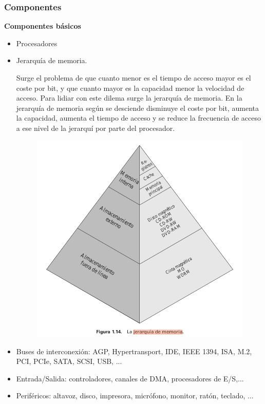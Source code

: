 \documentclass{article}
\begin{document}
\subsubsection{Componentes}
\textbf{Componentes básicos}
\begin{itemize}
\item Procesadores
\item Jerarquía de memoria.

Surge el problema de que cuanto menor es el tiempo de acceso mayor es el coste por bit, y que cuanto mayor es la capacidad menor la velocidad de acceso. Para lidiar con este dilema surge la jerarquía de memoria. En la jerarquía de memoria según se desciende disminuye el coste por bit, aumenta la capacidad, aumenta el tiempo de acceso y se reduce la frecuencia de acceso a ese nivel de la jerarquí por parte del procesador.

\begin{figure}[h]
\centering
\includegraphics[scale=1,width=\textwidth]{jerarquiamemoria.png}
\end{figure}


\item Buses de interconexión: AGP, Hypertransport, IDE, IEEE 1394, ISA, M.2, PCI, PCIe, SATA, SCSI, USB, ...
\item Entrada/Salida: controladores, canales de DMA, procesadores de E/S,...
\item Periféricos: altavoz, disco, impresora, micrófono, monitor, ratón, teclado, ...
\end{itemize}
\end{document}
